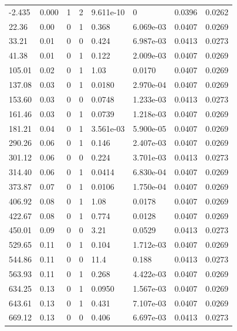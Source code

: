 \documentclass[preview]{standalone}
\begin{document}
{{\begin{tabular}{L{1.2cm}C{1.2cm} C{0.3cm}C{0.5cm} C{1.4cm}C{1.4cm} C{1.4cm}C{1.4cm}}
  -2.435  &  0.000  & 1     &  2 &  9.611e-10  & 0  & 0.0396 &  0.0262   \\ 
  22.36  &  0.00  & 0     &  1 &  0.368  & 6.069e-03  & 0.0407 &  0.0269   \\ 
  33.21  &  0.01  & 0     &  0 &  0.424  & 6.987e-03  & 0.0413 &  0.0273   \\ 
  41.38  &  0.01  & 0     &  1 &  0.122  & 2.009e-03  & 0.0407 &  0.0269   \\ 
  105.01  &  0.02  & 0     &  1 &  1.03  & 0.0170  & 0.0407 &  0.0269   \\ 
  137.08  &  0.03  & 0     &  1 &  0.0180  & 2.970e-04  & 0.0407 &  0.0269   \\ 
  153.60  &  0.03  & 0     &  0 &  0.0748  & 1.233e-03  & 0.0413 &  0.0273   \\ 
  161.46  &  0.03  & 0     &  1 &  0.0739  & 1.218e-03  & 0.0407 &  0.0269   \\ 
  181.21  &  0.04  & 0     &  1 &  3.561e-03  & 5.900e-05  & 0.0407 &  0.0269   \\ 
  290.26  &  0.06  & 0     &  1 &  0.146  & 2.407e-03  & 0.0407 &  0.0269   \\ 
  301.12  &  0.06  & 0     &  0 &  0.224  & 3.701e-03  & 0.0413 &  0.0273   \\ 
  314.40  &  0.06  & 0     &  1 &  0.0414  & 6.830e-04  & 0.0407 &  0.0269   \\ 
  373.87  &  0.07  & 0     &  1 &  0.0106  & 1.750e-04  & 0.0407 &  0.0269   \\ 
  406.92  &  0.08  & 0     &  1 &  1.08  & 0.0178  & 0.0407 &  0.0269   \\ 
  422.67  &  0.08  & 0     &  1 &  0.774  & 0.0128  & 0.0407 &  0.0269   \\ 
  450.01  &  0.09  & 0     &  0 &  3.21  & 0.0529  & 0.0413 &  0.0273   \\ 
  529.65  &  0.11  & 0     &  1 &  0.104  & 1.712e-03  & 0.0407 &  0.0269   \\ 
  544.86  &  0.11  & 0     &  0 &  11.4  & 0.188  & 0.0413 &  0.0273   \\ 
  563.93  &  0.11  & 0     &  1 &  0.268  & 4.422e-03  & 0.0407 &  0.0269   \\ 
  634.25  &  0.13  & 0     &  1 &  0.0950  & 1.567e-03  & 0.0407 &  0.0269   \\ 
  643.61  &  0.13  & 0     &  1 &  0.431  & 7.107e-03  & 0.0407 &  0.0269   \\ 
  669.12  &  0.13  & 0     &  0 &  0.406  & 6.697e-03  & 0.0413 &  0.0273   \\ 

\end{tabular}}}
\end{document}
